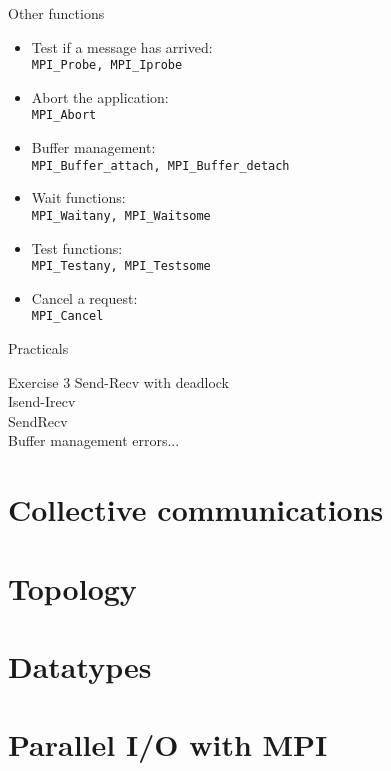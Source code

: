 \documentclass[aspectratio=43]{beamer}
\begin{document}
\begin{frame}[fragile]{Other functions}
\begin{itemize}
    \item Test if a message has arrived:\\\hspace{1cm}\verb+MPI_Probe, MPI_Iprobe+
    \item Abort the application:\\\hspace{1cm}\verb+MPI_Abort+
    \item Buffer management:\\\hspace{1cm}\verb+MPI_Buffer_attach, MPI_Buffer_detach+
    \item Wait functions:\\\hspace{1cm}\verb+MPI_Waitany, MPI_Waitsome+
    \item Test functions:\\\hspace{1cm}\verb+MPI_Testany, MPI_Testsome+
    \item Cancel a request:\\\hspace{1cm}\verb+MPI_Cancel+
\end{itemize}
\end{frame}

\begin{frame}{Practicals}
    \begin{brown2block}{Exercise 3}
        Send-Recv with deadlock\\
        Isend-Irecv\\
        SendRecv\\
        Buffer management errors...\\
    \end{brown2block}
\end{frame}

\section{Collective communications}
\section{Topology}
\section{Datatypes}
\section{Parallel I/O with MPI}

\end{document}
